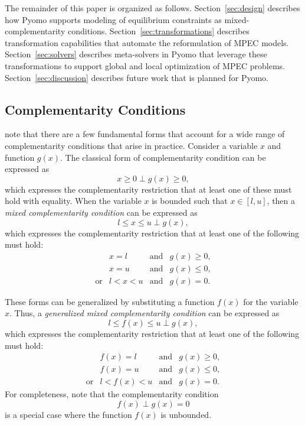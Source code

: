The remainder of this paper is organized as follows.
Section~\ref{sec:design} describes how Pyomo supports modeling of
equilibrium constraints as mixed-complementarity conditions.
Section~\ref{sec:transformations} describes transformation capabilities
that automate the reformulation of MPEC models.  Section~\ref{sec:solvers}
describes meta-solvers in Pyomo that leverage these transformations
to support global and local optimization of MPEC problems.
Section~\ref{sec:discussion}
describes future work that is planned for Pyomo.



\label{sec:design}

\subsection{Complementarity Conditions}

\citet{FerFouGay99} note that there are a few fundamental forms
that account for a wide range of complementarity conditions that
arise in practice.  Consider a variable $x$ and function $g(x)$.  The classical form of 
complementarity condition can be expressed as
\[
x \geq 0  \;\bot\;  g(x) \geq 0, 
\]
which expresses the complementarity restriction that at least one of these 
must hold with equality.
When the variable $x$ is bounded such that $x \in [l, u]$, then 
a \textit{mixed complementarity condition} can be expressed as
\[
l \leq x \leq u  \;\bot\;  g(x),
\]
which expresses the complementarity restriction that at least one of the following
must hold:
\[
\begin{array}{llll}
& x = l & \text{and} & g(x) \geq 0,\\
& x = u & \text{and} & g(x) \leq 0,\\
\text{or} & l < x < u & \text{and} & g(x) = 0.
\end{array}
\]

These forms can be generalized by substituting a function $f(x)$ for the variable $x$.  Thus,
a \textit{generalized mixed complementarity condition} can be expressed as
\[
l \leq f(x) \leq u  \;\bot\;  g(x),
\]
which expresses the complementarity restriction that at least one of the following
must hold:
\[
\begin{array}{llll}
& f(x) = l & \text{and} & g(x) \geq 0,\\
& f(x) = u & \text{and} & g(x) \leq 0,\\
\text{or} & l < f(x) < u & \text{and} & g(x) = 0.
\end{array}
\]
For completeness, note that the complementarity condition
\[
f(x)  \;\bot\;  g(x) = 0
\]
is a special case where the function $f(x)$ is unbounded.


